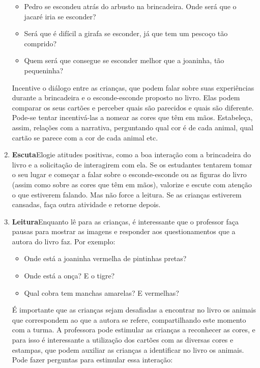 \documentclass[11pt]{extarticle}
\begin{document}
\begin{enumerate}
\begin{itemize}
\item Pedro se escondeu atrás do arbusto na brincadeira. Onde será que o jacaré iria se esconder?
\item Será que é difícil a girafa se esconder, já que tem um pescoço tão comprido?
\item Quem será que consegue se esconder melhor que a joaninha, tão pequeninha?
\end{itemize}

Incentive o diálogo entre as crianças, que podem falar sobre suas experiências durante a brincadeira e o esconde-esconde proposto no livro.
Elas podem comparar os seus cartões e perceber quais são parecidos e quais são diferente. Pode-se tentar incentivá-las a nomear as cores que têm em mãos.
Estabeleça, assim, relações com a narrativa, perguntando qual cor é de cada animal, qual cartão se parece com a cor de cada animal etc.

\item \textbf{Escuta}\quad Elogie atitudes positivas, como 
a boa interação com a brincadeira do livro e a solicitação de interagirem com ela. Se os estudantes tentarem 
tomar o seu lugar e começar a falar sobre o esconde-esconde ou as figuras do livro (assim como sobre as cores que têm em mãos), valorize e escute com atenção o que estiverem falando. Mas não  force a leitura. Se as crianças estiverem cansadas, faça outra atividade 
e retorne depois. 

\item \textbf{Leitura}\quad Enquanto lê para as crianças, é interessante que o professor faça pausas para mostrar as imagens e responder aos questionamentos que a autora do livro faz. Por exemplo:

\begin{itemize}
\item Onde está a joaninha vermelha de pintinhas pretas?
\item Onde está a onça? E o tigre?
\item Qual cobra tem manchas amarelas? E vermelhas?
\end{itemize}

É importante que as crianças sejam desafiadas a encontrar no livro os animais que correspondem ao que a autora se refere, compartilhando este momento com a turma. A professora pode estimular as crianças a reconhecer as cores, e para isso é interessante a utilização dos cartões com as diversas cores e estampas, que podem auxiliar as crianças a identificar no livro os animais. 
Pode fazer perguntas para estimular essa interação:



\end{enumerate}
\end{document}
